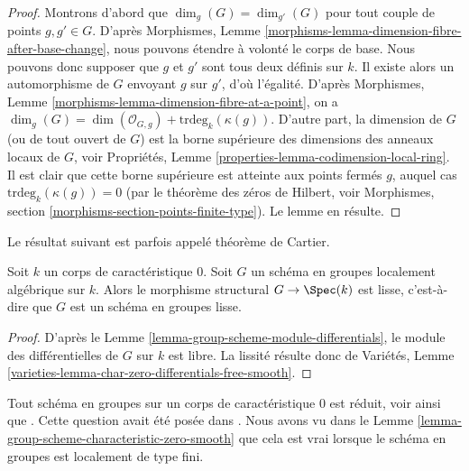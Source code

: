 \begin{proof}
Montrons d'abord que $\dim_g(G) = \dim_{g'}(G)$ pour tout
couple de points $g, g' \in G$. D'après
Morphismes, Lemme \ref{morphisms-lemma-dimension-fibre-after-base-change},
nous pouvons étendre à volonté le corps de base. Nous pouvons donc supposer que
$g$ et $g'$ sont tous deux définis sur $k$. Il existe alors un
automorphisme de $G$ envoyant $g$ sur $g'$, d'où l'égalité.
D'après
Morphismes, Lemme \ref{morphisms-lemma-dimension-fibre-at-a-point},
on a
$\dim_g(G) = \dim(\mathcal{O}_{G, g}) +
\text{trdeg}_k(\kappa(g))$.
D'autre part, la dimension de $G$ (ou de tout ouvert de $G$)
est la borne supérieure des dimensions des anneaux locaux de $G$, voir
Propriétés, Lemme \ref{properties-lemma-codimension-local-ring}.
Il est clair que cette borne supérieure est atteinte aux points fermés $g$, auquel cas
$\text{trdeg}_k(\kappa(g)) = 0$ (par le théorème des zéros de Hilbert, voir
Morphismes, section \ref{morphisms-section-points-finite-type}).
Le lemme en résulte.
\end{proof}

\noindent
Le résultat suivant est parfois appelé théorème de Cartier.

\begin{lemma}
\label{lemma-group-scheme-characteristic-zero-smooth}
Soit $k$ un corps de caractéristique $0$. Soit $G$ un
schéma en groupes localement algébrique sur $k$. Alors le morphisme
structural $G \to \Spec(k)$ est lisse, c'est-à-dire que $G$ est un
schéma en groupes lisse.
\end{lemma}

\begin{proof}
D'après le
Lemme \ref{lemma-group-scheme-module-differentials},
le module des différentielles de $G$ sur $k$ est libre.
La lissité résulte donc de
Variétés, Lemme \ref{varieties-lemma-char-zero-differentials-free-smooth}.
\end{proof}

\begin{remark}
\label{remark-when-reduced}
Tout schéma en groupes sur un corps de caractéristique $0$ est réduit, voir
\cite[I, théorème 1.1 et I, corollaire 3.9, et II, théorème 2.4]{Perrin-thesis}
ainsi que
\cite[Proposition 4.2.8]{Perrin}.
Cette question avait été posée dans
\cite[page 80]{Oort}.
Nous avons vu dans le
Lemme \ref{lemma-group-scheme-characteristic-zero-smooth}
que cela est vrai lorsque le schéma en groupes est localement de type fini.
\end{remark}

